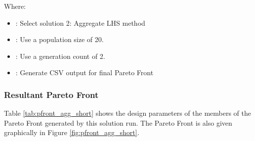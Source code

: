 \noindent Where: 

\begin{itemize}
  \item {}: Select solution 2: Aggregate LHS method
  \item {}: Use a population size of 20. 
  \item {}: Use a generation count of 2. 
  \item {}: Generate CSV output for final Pareto Front
\end{itemize}

\subsubsection{Resultant Pareto Front}
Table \ref{tab:pfront_agg_short} shows the design parameters of the members of the Pareto Front generated by this solution run. The Pareto Front is also given graphically in Figure \ref{fig:pfront_agg_short}. 
